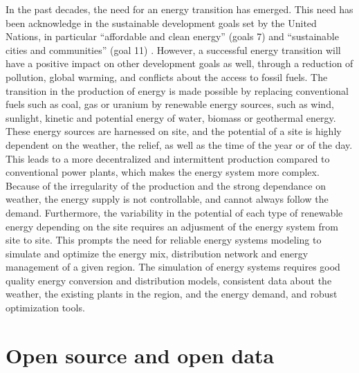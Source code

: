 In the past decades, the need for an energy transition has emerged. This need has been acknowledge in the sustainable development goals \cite{un_sdgs} set by the United Nations, in particular ``affordable and clean energy'' (goals 7) \cite{un_sdg7} and ``sustainable cities and communities'' (goal 11) \cite{un_sdg11}. However, a successful energy transition will have a positive impact on other development goals as well, through a reduction of pollution, global warming, and conflicts about the access to fossil fuels. \newline
The transition in the production of energy is made possible by replacing conventional fuels such as coal, gas or uranium by renewable energy sources, such as wind, sunlight, kinetic and potential energy of water, biomass or geothermal energy. These energy sources are harnessed on site, and the potential of a site is highly dependent on the weather, the relief, as well as the time of the year or of the day. This leads to a more decentralized and intermittent production compared to conventional power plants, which makes the energy system more complex. \newline
Because of the irregularity of the production and the strong dependance on weather, the energy supply is not controllable, and cannot always follow the demand. Furthermore, the variability in the potential of each type of renewable energy depending on the site requires an adjusment of the energy system from site to site. This prompts the need for reliable energy systems modeling to simulate and optimize the energy mix, distribution network and energy management of a given region. The simulation of energy systems requires good quality energy conversion and distribution models, consistent data about the weather, the existing plants in the region, and the energy demand, and robust optimization tools.


\section{Open source and open data}

